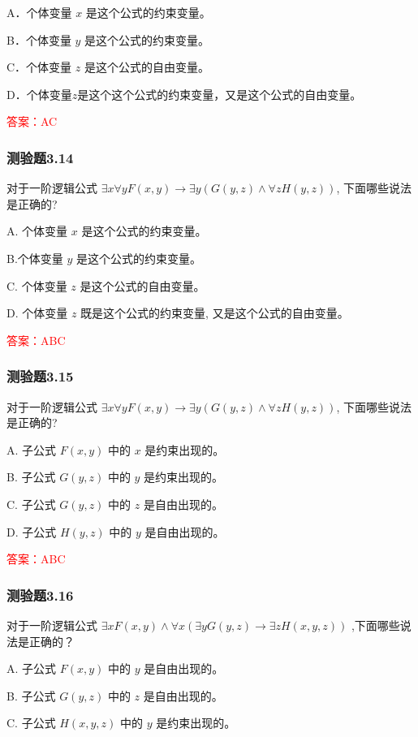 \documentclass[UTF8, heading=true]{ctexart}
\begin{document}
A．个体变量 $x$ 是这个公式的约束变量。

B．个体变量 $y$ 是这个公式的约束变量。

C．个体变量 $z$ 是这个公式的自由变量。

D．个体变量$z$是这个这个公式的约束变量，又是这个公式的自由变量。

\textcolor{red}{答案：AC}

\subsubsection{测验题3.14}

对于一阶逻辑公式 $\exists x \forall y F(x, y) \rightarrow \exists y(G(y, z) \wedge \forall z H(y, z))$, 下面哪些说法是正确的?

A. 个体变量 $x$ 是这个公式的约束变量。

B.个体变量 $y$ 是这个公式的约束变量。

C. 个体变量 $z$ 是这个公式的自由变量。

D. 个体变量 $z$ 既是这个公式的约束变量, 又是这个公式的自由变量。

\textcolor{red}{答案：ABC}

\subsubsection{测验题3.15}

对于一阶逻辑公式 $\exists x \forall y F(x, y) \rightarrow \exists y(G(y, z) \wedge \forall z H(y, z))$, 下面哪些说法是正确的?

A. 子公式 $F(x, y)$ 中的 $x$ 是约束出现的。

B.  子公式 $G(y, z)$ 中的 $y$ 是约束出现的。

C. 子公式 $G(y, z)$ 中的 $z$ 是自由出现的。

D. 子公式 $H(y, z)$ 中的 $y$ 是自由出现的。

\textcolor{red}{答案：ABC}

\subsubsection{测验题3.16}

对于一阶逻辑公式 $\exists x F(x, y) \wedge \forall x(\exists y G(y, z) \rightarrow \exists z H(x, y, z))$ ,下面哪些说法是正确的？

A. 
子公式 $F(x, y)$ 中的 $y$ 是自由出现的。

B. 
子公式 $G(y, z)$ 中的 $z$ 是自由出现的。

C. 
子公式 $H(x, y, z)$ 中的 $y$ 是约束出现的。
\end{document}
